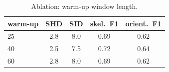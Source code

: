 \begin{table}[htbp]
\centering
\caption{Ablation: warm-up window length.}
\label{tab:abl_warmup}
\begin{tabular}{lcccc}
\hline
warm-up & SHD & SID & skel.\ F1 & orient.\ F1 \\
\hline
25 & 2.8 & 8.0 & 0.69 & 0.62 \\
40 & 2.5 & 7.5 & 0.72 & 0.64 \\
60 & 2.8 & 8.0 & 0.69 & 0.62 \\
\hline
\end{tabular}
\end{table}
